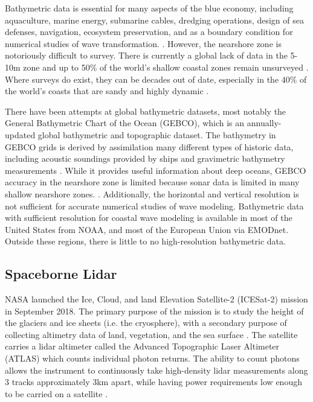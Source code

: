 Bathymetric data is essential for many aspects of the blue economy, including aquaculture, marine energy, submarine cables, dredging operations, design of sea defenses, navigation, ecosystem preservation, and as a boundary condition for numerical studies of wave transformation. \parencite{Cesbron2021,Ashphaq2021}. However, the nearshore zone is notoriously difficult to survey. There is currently a global lack of data in the 5-10m zone \parencite{Albright2021} and up to 50\% of the world's shallow coastal zones remain unsurveyed \parencite{IHO/OHI2022}. Where surveys do exist, they can be decades out of date, especially in the 40\% of the world's coasts that are sandy and highly dynamic \parencite{Almar2021e}.

There have been attempts at global bathymetric datasets, most notably the General Bathymetric Chart of the Ocean (GEBCO), which is an annually-updated global bathymetric and topographic dataset. The bathymetry in GEBCO grids is derived by assimilation many different types of historic data, including  acoustic soundings provided by ships and gravimetric bathymetry measurements \parencite{Cesbron2021}. While it provides useful information about deep oceans, GEBCO accuracy in the nearshore zone is limited because sonar data is limited in many shallow nearshore zones. \parencite{Monteys2015}. Additionally, the horizontal and vertical resolution is not sufficient for accurate numerical studies of wave modeling. Bathymetric data with sufficient resolution for coastal wave modeling is available in most of the United States from NOAA, and most of the European Union via EMODnet. Outside these regions, there is little to no high-resolution bathymetric data. 

\subsection{Spaceborne Lidar}

NASA launched the Ice, Cloud, and land Elevation Satellite-2 (ICESat-2) mission in September 2018. The primary purpose of the mission is to study the height of the glaciers and ice sheets (i.e. the cryosphere), with a secondary purpose of collecting altimetry data of land, vegetation, and the sea surface \parencite{Markus2017}. The satellite carries a lidar altimeter called the Advanced Topographic Laser Altimeter (ATLAS) which counts individual photon returns. The ability to count photons allows the instrument to continuously take high-density lidar measurements along 3 tracks approximately 3km apart, while having power requirements low enough to be carried on a satellite \parencite{Popescu2018}. 

